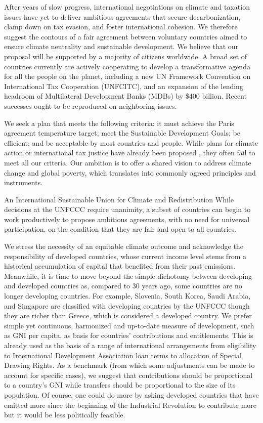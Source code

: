 \documentclass[12pt,english]{article}
\begin{document}
\onehalfspacing 
\begin{bibunit}

After years of slow progress, international negotiations on climate and taxation issues have yet to deliver ambitious agreements that secure decarbonization, clamp down on tax evasion, and foster international cohesion. We therefore suggest the contours of a fair agreement between voluntary countries aimed to ensure climate neutrality and sustainable development. We believe that our proposal will be supported by a majority of citizens worldwide.
A broad set of countries currently are actively cooperating to develop a transformative agenda for all the people on the planet, including a new UN Framework Convention on International Tax Cooperation (UNFCITC), and an expansion of the lending headroom of Multilateral Development Banks (MDBs) by \$400 billion. Recent successes ought to be reproduced on neighboring issues.

We seek a plan that meets the following criteria: it must achieve the Paris agreement temperature target; meet the Sustainable Development Goals; be efficient; and be acceptable by most countries and people. While plans for climate action or international tax justice have already been proposed \citep{pisani-ferry_global_2025,zucman_blueprint_2024,bolton_why_2025}, they often fail to meet all our criteria. Our ambition is to offer a shared vision to address climate change and global poverty, which translates into commonly agreed principles and instruments.

An International Sustainable Union for Climate and Redistribution
While decisions at the UNFCCC require unanimity, a subset of countries can begin to work productively to propose ambitious agreements, with no need for universal participation, on the condition that they are fair and open to all countries.

We stress the necessity of an equitable climate outcome and acknowledge the responsibility of developed countries, whose current income level stems from a historical accumulation of capital that benefited from their past emissions. Meanwhile, it is time to move beyond the simple dichotomy between developing and developed countries as, compared to 30 years ago, some countries are no longer developing countries. For example, Slovenia, South Korea, Saudi Arabia, and Singapore are classified with developing countries by the UNFCCC though they are richer than Greece, which is considered a developed country. We prefer simple yet continuous, harmonized and up-to-date measure of development, such as GNI per capita, as basis for countries' contributions and entitlements. This is already used as the basis of a range of international arrangements from eligibility to International Development Association loan terms to allocation of Special Drawing Rights. As a benchmark (from which some adjustments can be made to account for specific cases), we suggest that contributions should be proportional to a country's GNI while transfers should be proportional to the size of its population. Of course, one could do more by asking developed countries that have emitted more since the beginning of the Industrial Revolution to contribute more but it would be less politically feasible.


\end{bibunit}
\end{document}
